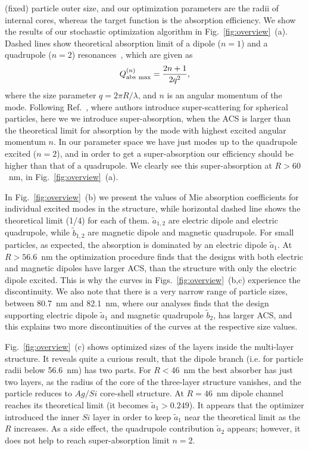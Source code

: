 \documentclass[aps,prl,twocolumn,showpacs,superscriptaddress,groupedaddress]{revtex4-1}
\begin{document}
(fixed) particle outer size, and our optimization parameters are the
radii of internal cores, whereas the target function is the absorption
efficiency.  We show the results of our stochastic optimization
algorithm in Fig.~\ref{fig:overview}~(a).  Dashed lines show
theoretical absorption limit of a dipole ($n=1$) and a quadrupole
($n=2$) resonances~\cite{Tribelsky-2011}, which are given
as $$Q^{(n)}_{\rm abs\ max}=\frac{2n+1}{2q^2},$$ where the size
parameter $q=2\pi R/\lambda$, and $n$ is an angular momentum of the
mode. Following Ref.~\cite{Fan-2011}, where authors introduce
super-scattering for spherical particles, here we we introduce
super-absorption, when the ACS is larger than the theoretical limit
for absorption by the mode with highest excited angular momentum
$n$. In our parameter space we have just modes up to the quadrupole
excited ($n=2$), and in order to get a super-absorption our efficiency
should be higher than that of a quadrupole. We clearly see this
super-absorption at $R>60$~nm, in Fig.~\ref{fig:overview}~(a).

In Fig.~\ref{fig:overview}~(b) we present the values of Mie absorption
coefficients for individual excited modes in the structure, while
horizontal dashed line shows the theoretical limit (1/4) for each of
them. $\tilde{a}_{1,2}$ are electric dipole and electric quadrupole,
while $\tilde{b}_{1,2}$ are magnetic dipole and magnetic
quadrupole. For small particles, as expected, the absorption is
dominated by an electric dipole $\tilde{a}_1$.  At $R > 56.6$~nm the
optimization procedure finds that the designs with both electric and
magnetic dipoles have larger ACS, than the structure with only the
electric dipole excited. This is why the curves in
Figs.~\ref{fig:overview}~(b,c) experience the discontinuity. We also
note that there is a very narrow range of particle sizes, between
80.7~nm and 82.1~nm, where our analyses finds that the design
supporting electric dipole $\tilde{a}_1$ and magnetic quadrupole
$\tilde{b}_2$, has larger ACS, and this explains two more
discontinuities of the curves at the respective size values.

Fig.~\ref{fig:overview}~(c) shows optimized sizes of the layers inside
the multi-layer structure. It reveals quite a curious result, that the
dipole branch (i.e. for particle radii below 56.6~nm) has two
parts. For $R<46$~nm the best absorber has just two layers, as the
radius of the core of the three-layer structure vanishes, and the
particle reduces to $Ag/Si$ core-shell structure.  At $R=46$~nm dipole
channel reaches its theoretical limit (it becomes
$\tilde{a}_1>0.249$).  It appears that the optimizer introduced the
inner $Si$ layer in order to keep $\tilde{a}_1$ near the theoretical
limit as the $R$ increases.  As a side effect, the quadrupole
contribution $\tilde{a}_2$ appears; however, it does not help to reach
super-absorption limit $n=2$.
\end{document}
